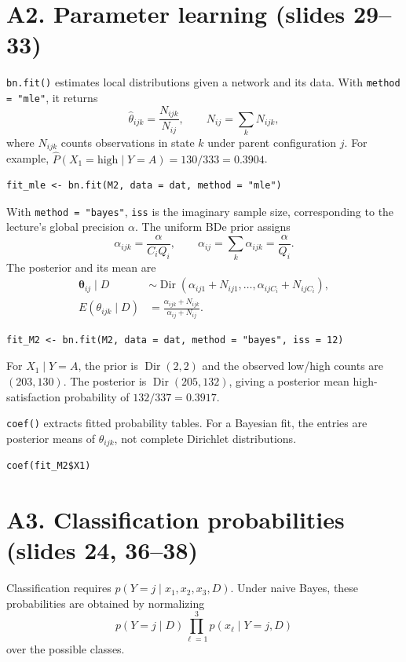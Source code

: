 \documentclass[11pt]{article}
\newcommand{\code}[1]{\texttt{#1}}
\begin{document}
\section*{A2. Parameter learning \normalfont\small (slides 29--33)}
\code{bn.fit()} estimates local distributions given a network and its data.
With \code{method = "mle"}, it returns
\[
 \widehat\theta_{ijk}=\frac{N_{ijk}}{N_{ij}},\qquad
 N_{ij}=\sum_k N_{ijk},
\]
where $N_{ijk}$ counts observations in state $k$ under parent configuration
$j$. For example, $\widehat P(X_1=\mathrm{high}\mid Y=A)=130/333=0.3904$.
\begin{lstlisting}
fit_mle <- bn.fit(M2, data = dat, method = "mle")
\end{lstlisting}

\newpage
With \code{method = "bayes"}, \code{iss} is the imaginary sample size,
corresponding to the lecture's global precision $\alpha$. The uniform BDe
prior assigns
\[
 \alpha_{ijk}=\frac{\alpha}{C_iQ_i},\qquad
 \alpha_{ij}=\sum_k\alpha_{ijk}=\frac{\alpha}{Q_i}.
\]
The posterior and its mean are
\begin{align*}
 \boldsymbol\theta_{ij}\mid D
 &\sim\operatorname{Dir}(\alpha_{ij1}+N_{ij1},\ldots,
                         \alpha_{ijC_i}+N_{ijC_i}),\\
 E(\theta_{ijk}\mid D)
 &=\frac{\alpha_{ijk}+N_{ijk}}{\alpha_{ij}+N_{ij}}.
\end{align*}
\begin{lstlisting}
fit_M2 <- bn.fit(M2, data = dat, method = "bayes", iss = 12)
\end{lstlisting}
For $X_1\mid Y=A$, the prior is $\operatorname{Dir}(2,2)$ and the observed
low/high counts are $(203,130)$. The posterior is
$\operatorname{Dir}(205,132)$, giving a posterior mean high-satisfaction
probability of $132/337=0.3917$.

\code{coef()} extracts fitted probability tables. For a Bayesian fit,
the entries are posterior means of $\theta_{ijk}$, not complete
Dirichlet distributions.
\begin{lstlisting}
coef(fit_M2$X1)
\end{lstlisting}

\section*{A3. Classification probabilities \normalfont\small (slides 24, 36--38)}
Classification requires $p(Y=j\mid x_1,x_2,x_3,D)$. Under naive Bayes,
these probabilities are obtained by normalizing
\[
 p(Y=j\mid D)\prod_{\ell=1}^{3}p(x_\ell\mid Y=j,D)
\]
over the possible classes.
\end{document}
